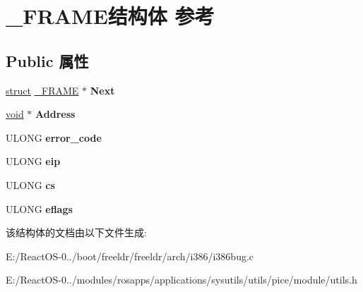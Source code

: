 \hypertarget{struct___f_r_a_m_e}{}\section{\+\_\+\+F\+R\+A\+M\+E结构体 参考}
\label{struct___f_r_a_m_e}
\subsection*{Public 属性}
\begin{DoxyCompactItemize}
\item 
\mbox{\label{struct___f_r_a_m_e_a8d5b6f442bf3c57f81089f2c88504253}} 
\hyperlink{interfacestruct}{struct} \hyperlink{struct___f_r_a_m_e}{\+\_\+\+F\+R\+A\+ME} $\ast$ {\bfseries Next}
\item 
\mbox{\label{struct___f_r_a_m_e_af56108a0d9bddbf389bc42cb52686db1}} 
\hyperlink{interfacevoid}{void} $\ast$ {\bfseries Address}
\item 
\mbox{\label{struct___f_r_a_m_e_afa174c6c91f0c72e380439c52952b3e4}} 
U\+L\+O\+NG {\bfseries error\+\_\+code}
\item 
\mbox{\label{struct___f_r_a_m_e_a34c68ff4683639e06fd17fdda9b77167}} 
U\+L\+O\+NG {\bfseries eip}
\item 
\mbox{\label{struct___f_r_a_m_e_a3f16e1e9b79f4634a81755facf79e4c4}} 
U\+L\+O\+NG {\bfseries cs}
\item 
\mbox{\label{struct___f_r_a_m_e_ac8619993a6015969879c391f622d0d20}} 
U\+L\+O\+NG {\bfseries eflags}
\end{DoxyCompactItemize}


该结构体的文档由以下文件生成\+:\begin{DoxyCompactItemize}
\item 
E\+:/\+React\+O\+S-\/0../boot/freeldr/freeldr/arch/i386/i386bug.\+c\item 
E\+:/\+React\+O\+S-\/0../modules/rosapps/applications/sysutils/utils/pice/module/utils.\+h\end{DoxyCompactItemize}
